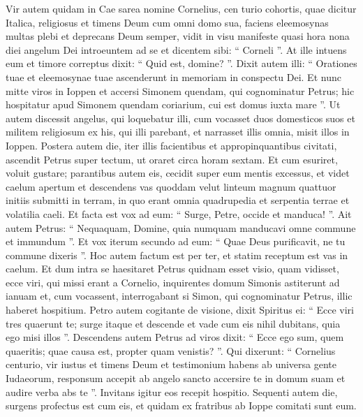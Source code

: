 \begin{biblechapter}
\begin{biblechapter}
\begin{biblechapter}
\begin{biblechapter}
\begin{biblechapter}
\begin{biblechapter}
\begin{biblechapter}
\begin{biblechapter}
\begin{biblechapter}
\begin{biblechapter}
\verse Vir autem quidam in Cae sarea nomine Cornelius, cen turio cohortis, quae dicitur Italica, 
\verse religiosus et timens Deum cum omni domo sua, faciens eleemosynas multas plebi et deprecans Deum semper, 
\verse vidit in visu manifeste quasi hora nona diei angelum Dei introeuntem ad se et dicentem sibi: “ Corneli ”. 
\verse At ille intuens eum et timore correptus dixit: “ Quid est, domine? ”. Dixit autem illi: “ Orationes tuae et eleemosynae tuae ascenderunt in memoriam in conspectu Dei. 
\verse Et nunc mitte viros in Ioppen et accersi Simonem quendam, qui cognominatur Petrus; 
\verse hic hospitatur apud Simonem quendam coriarium, cui est domus iuxta mare ”. 
\verse Ut autem discessit angelus, qui loquebatur illi, cum vocasset duos domesticos suos et militem religiosum ex his, qui illi parebant, 
\verse et narrasset illis omnia, misit illos in Ioppen.
 \verse Postera autem die, iter illis facientibus et appropinquantibus civitati, ascendit Petrus super tectum, ut oraret circa horam sextam. 
\verse Et cum esuriret, voluit gustare; parantibus autem eis, cecidit super eum mentis excessus, 
\verse et videt caelum apertum et descendens vas quoddam velut linteum magnum quattuor initiis submitti in terram, 
\verse in quo erant omnia quadrupedia et serpentia terrae et volatilia caeli. 
\verse Et facta est vox ad eum: “ Surge, Petre, occide et manduca! ”. 
\verse Ait autem Petrus: “ Nequaquam, Domine, quia numquam manducavi omne commune et immundum ”. 
\verse Et vox iterum secundo ad eum: “ Quae Deus purificavit, ne tu commune dixeris ”. 
\verse Hoc autem factum est per ter, et statim receptum est vas in caelum. 
\verse Et dum intra se haesitaret Petrus quidnam esset visio, quam vidisset, ecce viri, qui missi erant a Cornelio, inquirentes domum Simonis astiterunt ad ianuam 
\verse et, cum vocassent, interrogabant si Simon, qui cognominatur Petrus, illic haberet hospitium. 
\verse Petro autem cogitante de visione, dixit Spiritus ei: “ Ecce viri tres quaerunt te; 
\verse surge itaque et descende et vade cum eis nihil dubitans, quia ego misi illos ”. 
\verse Descendens autem Petrus ad viros dixit: “ Ecce ego sum, quem quaeritis; quae causa est, propter quam venistis? ”. 
 \verse Qui dixerunt: “ Cornelius centurio, vir iustus et timens Deum et testimonium habens ab universa gente Iudaeorum, responsum accepit ab angelo sancto accersire te in domum suam et audire verba abs te ”. 
\verse Invitans igitur eos recepit hospitio.
 Sequenti autem die, surgens profectus est cum eis, et quidam ex fratribus ab Ioppe comitati sunt eum. 

\end{biblechapter}
\end{biblechapter}
\end{biblechapter}
\end{biblechapter}
\end{biblechapter}
\end{biblechapter}
\end{biblechapter}
\end{biblechapter}
\end{biblechapter}
\end{biblechapter}
